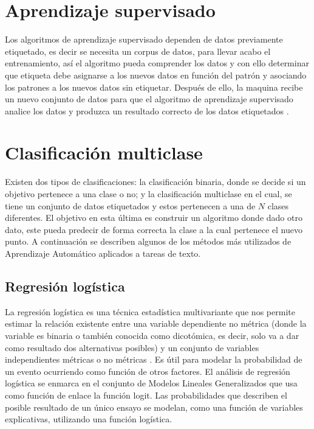 
\section[A Supervisado]{Aprendizaje supervisado}

Los algoritmos de aprendizaje supervisado dependen de datos previamente etiquetado, es decir se necesita un corpus de datos, para llevar acabo el entrenamiento, así 
el algoritmo pueda comprender los datos y con ello determinar que etiqueta debe asignarse a los nuevos datos 
en función del patrón y asociando los patrones a los nuevos datos sin etiquetar. Después de ello, la maquina recibe 
un nuevo conjunto de datos para que el algoritmo de aprendizaje supervisado analice los datos y produzca un resultado 
correcto de los datos etiquetados \citep{CT4}.\\


\section[Clasificación]{Clasificación multiclase}

Existen dos tipos de clasificaciones: la clasificación binaria, donde se decide si un objetivo pertenece a una clase o no; y la clasificación multiclase en el cual, se tiene un conjunto de datos etiquetados y estos pertenecen a una de $N$ clases diferentes. El objetivo en esta última es construir un algoritmo donde dado otro dato, este pueda predecir de forma correcta la clase a la cual pertenece el nuevo punto. A continuación se describen algunos de los métodos más utilizados de Aprendizaje Automático aplicados a tareas de texto.


\subsection{Regresión logística}

La regresión logística es una técnica estadística multivariante que nos permite estimar la relación existente entre una variable dependiente 
no métrica (donde la variable es binaria o también conocida como dicotómica, es decir, solo va a dar como resultado dos alternativas posibles) 
y un conjunto de variables independientes métricas o no métricas \citep{CT6}. Es útil para modelar la probabilidad de un evento ocurriendo como 
función de otros factores. El análisis de regresión logística se enmarca en el conjunto de Modelos Lineales Generalizados que usa como función de 
enlace la función logit. Las probabilidades que describen el posible resultado de un único ensayo se modelan, como una función de variables explicativas, 
utilizando una función logística.\\

